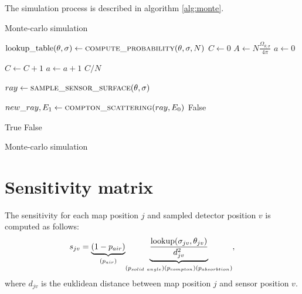 The simulation process is described in algorithm \ref{alg:monte}. 


\begin{algorithm}[h!]
\caption{Monte-carlo simulation}\label{alg:cap}

\begin{algorithmic}

      \State $\mathrm{lookup\_table}(\theta, \sigma) \gets \Call{compute\_probability}{\theta, \sigma, N}$
    \EndFor
  \EndFor
\EndFunction
\Statex
{}
\State $C \gets 0$
\State $A \gets N\frac{\Omega_{\theta, \sigma}}{4 \pi}$ 
\State $a \gets 0$
   
      
  \State $C \gets C + 1 $ 
  \EndIf
  \State $a \gets a + 1$
\EndWhile
  \State \Return $C/N$ 

  \EndFunction


\Statex

  \State $ray \gets \Call{sample\_sensor\_surface}{\theta,\sigma}$ 

   
  \State $new\_ray, E_{1} \gets \Call{compton\_scattering}{ray, E_{0}}$ 
  \Else{}
    \State \Return False 
  \EndIf
  
    
    \State \Return True
  \Else{}
    \State \Return False
  \EndIf
\EndFunction
\end{algorithmic}
  \label{alg:monte}
  \caption{Monte-carlo simulation}
\end{algorithm}


\section{Sensitivity matrix}
The sensitivity for each map position $j$ and sampled detector position $v$ is computed as follows:
\begin{equation}
  s_{jv} = \underset{(p_{air})}{\underbrace{(1-p_{air}) }} \underset{(p_{solid\ angle})\\(p_{compton})\\(p_{absorbtion})} {\underbrace{\frac{\mathrm{lookup}(\sigma_{jv}, \theta_{jv})}{d^{2}_{jv}}}},  
\end{equation}
where $d_{jv}$ is the euklidean distance between map position $j$ and sensor position $v$. 



